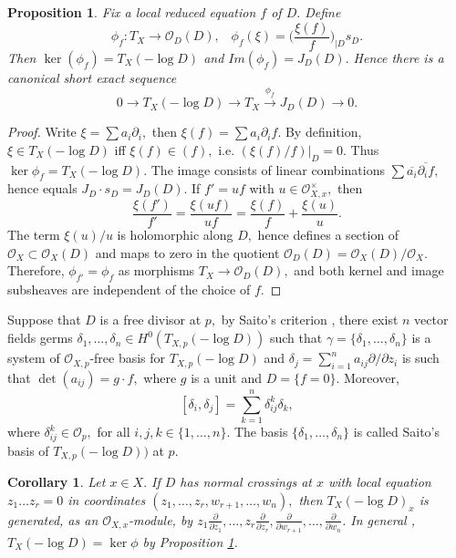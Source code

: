 \documentclass[12pt,reqno,a4paper]{amsart}
\numberwithin{equation}{section}
\theoremstyle{plain}
\newtheorem{proposition}[proposition]{Proposition}
\newtheorem{corollary}[corollary]{Corollary}
\theoremstyle{definition}
\newcommand{\cO}{\mathcal{O}}
\begin{document}
\begin{proposition} \label{prop:exact-sequence}
Fix a local reduced equation $f$ of $D.$ Define
$$\phi_f:T_X \to \cO_D(D), \;\;\; \phi_f(\xi) = \Big(\frac{\xi(f)}{f} \Big)_{|D} s_D.$$
Then $\ker(\phi_f) = T_X(-\log D)$ and $Im(\phi_f) = J_D(D).$ Hence there is a canonical short exact sequence 
\begin{equation} \label{eq:exact-sequence}
0 \to T_X(-\log D) \to T_X \xrightarrow{\phi_f} J_D (D) \to 0.
\end{equation}
\end{proposition}
\begin{proof}
Write $\xi = \sum a_i \partial_i,$ then $\xi(f) = \sum a_i \partial_i f.$ By definition, $\xi \in T_X(-\log D)$ iff $\xi(f) \in (f),$ i.e. $(\xi(f)/f)|_D = 0.$ Thus $\ker \phi_f = T_X(-\log D).$ The image consists of linear combinations $\sum \overline{a_i}\overline{\partial_i f},$ hence equals $J_D \cdot s_D = J_D(D).$
If $f'=uf$ with $u \in \cO_{X,x}^{\times},$ then
$$\frac{\xi(f')}{f'} = \frac{\xi(uf)}{uf} = \frac{\xi(f)}{f} + \frac{\xi(u)}{u}.$$
The term $\xi(u)/u$ is holomorphic along $D,$ hence defines a section of $\cO_X \subset \cO_X(D)$ and maps to zero in the quotient $\cO_D(D) = \cO_X(D)/\cO_X.$ Therefore, $\phi_{f'} = \phi_f$ as morphisms $T_X \to \cO_D(D),$ and both kernel and image subsheaves are independent of the choice of $f.$
\end{proof}

 

Suppose that $D$ is a free divisor at $p,$ by Saito’s criterion \cite{Saito}, there exist $n$ vector fields germs $\delta_1, \ldots,\delta_n  \in H^0(T_{X,p}(-\log D))$ such that $\gamma = \{\delta_1, \ldots ,\delta_n\}$ is a system of $\cO_{X,p}$-free basis for $T_{X,p}(-\log D)$ and
$\delta_j = \sum_{i=1}^n a_{ij} \partial /\partial z_i$
is such that $\det(a_{ij}) = g \cdot f,$ where $g$ is a unit and $D = \{f = 0\}.$  Moreover, $$[\delta_i, \delta_j] =  \displaystyle\sum_{k=1}^n \delta_{ij}^k \delta_k,$$ where $\delta_{ij}^k \in \cO_p,$ for all $i,j,k \in \{1, \ldots ,n\}.$
The basis $\{\delta_1, \ldots, \delta_n\}$ is called Saito’s basis of $T_{X,p}(-\log D))$ at $p.$

 

\begin{corollary} 
 Let $x \in X.$ If $D$ has normal crossings at $x$ with local equation $z_1 \ldots z_r=0$ in coordinates $(z_1, \ldots, z_r, w_{r+1}, \ldots, w_n),$ then 
  \(T_X(-\log D)_x\) is generated, as an \(\cO_{X,x}\)-module, by
\(z_1\frac{\partial}{\partial z_1},\ldots,
z_r\frac{\partial}{\partial z_r},
\frac{\partial}{\partial w_{r+1}},\ldots,
\frac{\partial}{\partial w_n}\).
 In general  , $T_X(-\log D) = \ker \phi$ by Proposition \ref{prop:exact-sequence}.
\end{corollary}
\end{document}
